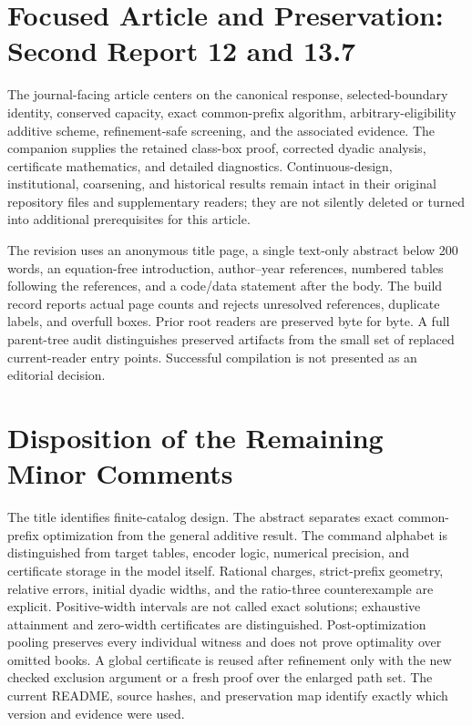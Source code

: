\section{Focused Article and Preservation: Second Report 12 and 13.7}
The journal-facing article centers on the canonical response, selected-boundary identity, conserved capacity, exact common-prefix algorithm, arbitrary-eligibility additive scheme, refinement-safe screening, and the associated evidence. The companion supplies the retained class-box proof, corrected dyadic analysis, certificate mathematics, and detailed diagnostics. Continuous-design, institutional, coarsening, and historical results remain intact in their original repository files and supplementary readers; they are not silently deleted or turned into additional prerequisites for this article.

The revision uses an anonymous title page, a single text-only abstract below 200 words, an equation-free introduction, author--year references, numbered tables following the references, and a code/data statement after the body. The build record reports actual page counts and rejects unresolved references, duplicate labels, and overfull boxes. Prior root readers are preserved byte for byte. A full parent-tree audit distinguishes preserved artifacts from the small set of replaced current-reader entry points. Successful compilation is not presented as an editorial decision.

\section*{Disposition of the Remaining Minor Comments}
The title identifies finite-catalog design. The abstract separates exact common-prefix optimization from the general additive result. The command alphabet is distinguished from target tables, encoder logic, numerical precision, and certificate storage in the model itself. Rational charges, strict-prefix geometry, relative errors, initial dyadic widths, and the ratio-three counterexample are explicit. Positive-width intervals are not called exact solutions; exhaustive attainment and zero-width certificates are distinguished. Post-optimization pooling preserves every individual witness and does not prove optimality over omitted books. A global certificate is reused after refinement only with the new checked exclusion argument or a fresh proof over the enlarged path set. The current README, source hashes, and preservation map identify exactly which version and evidence were used.
